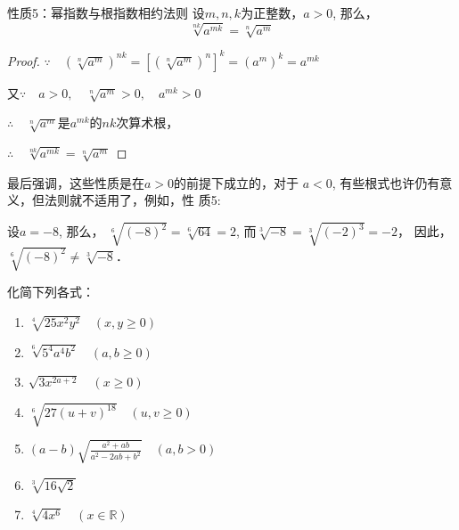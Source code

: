 \begin{blk}{性质5：幂指数与根指数相约法则}
设$m,n,k$为正整数，$a>0$, 那么，
\[\sqrt[nk]{a^{mk}}=\sqrt[n]{a^m} \]  
\end{blk}

\begin{proof}
$\because\quad \left(\sqrt[n]{a^m}\right)^{nk}=\left[\left(\sqrt[n]{a^m}\right)^n\right]^k=\left(a^m\right)^k=a^{mk}$

又$\because\quad a>0,\quad \sqrt[n]{a^m}>0,\quad a^{mk}>0 $
    
$\therefore\quad \sqrt[n]{a^m}$是$a^{mk}$的$nk$次算术根，

$\therefore\quad \sqrt[nk]{a^{mk}}=\sqrt[n]{a^m} $
\end{proof}

最后强调，这些性质是在$a>0$的前提下成立的，对于
$a<0$, 有些根式也许仍有意义，但法则就不适用了，例如，性
质5:

设$a=-8$, 那么，
$\sqrt[6]{(-8)^2}=\sqrt[6]{64}=2$, 而$\sqrt[3]{-8}=\sqrt[3]{(-2)^3}=-2$，
因此，$\sqrt[6]{(-8)^2}\ne \sqrt[3]{-8}$．



\begin{example}
    化简下列各式：
\begin{enumerate}
\item $\sqrt[4]{25 x^{2} y^{2}} \quad(x, y \ge 0)$
\item  $\sqrt[6]{5^{4} a^{4} b^{2}}\quad (a, b \ge 0)$
\item $\sqrt{3 x^{2 a+2}}\quad (x \ge 0)$
\item $\sqrt[6]{27(u+v)^{18}}\quad (u,v\ge 0)$
\item $(a-b) \sqrt{\frac{a^{2}+a b}{a^{2}-2 a b+b^{2}}}\quad (a, b>0)$
\item $\sqrt[3]{16 \sqrt{2}}$
\item $\sqrt[4]{4 x^{6}}\quad (x \in \mathbb{R})$
\end{enumerate}
\end{example}


